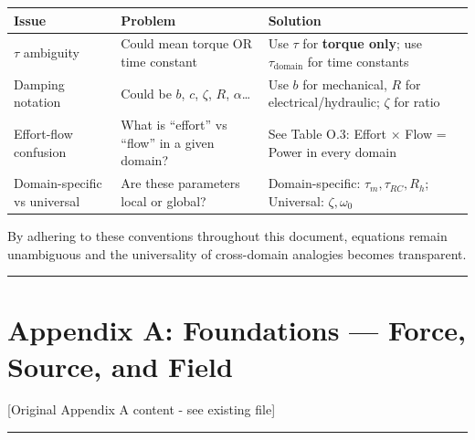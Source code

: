 \documentclass[
]{article}
\begin{document}
\begin{longtable}[]{@{}
  >{\raggedright\arraybackslash}p{}
  >{\raggedright\arraybackslash}p{}
  >{\raggedright\arraybackslash}p{}@{}}
\toprule\noalign{}
\begin{minipage}[b]{\linewidth}\raggedright
Issue
\end{minipage} & \begin{minipage}[b]{\linewidth}\raggedright
\textbf{Problem}
\end{minipage} & \begin{minipage}[b]{\linewidth}\raggedright
\textbf{Solution}
\end{minipage} \\
\midrule\noalign{}
\endhead
\bottomrule\noalign{}
\endlastfoot
\(\tau\) ambiguity & Could mean torque OR time constant & Use \(\tau\)
for \textbf{torque only}; use \(\tau_{\text{domain}}\) for time
constants \\
Damping notation & Could be \(b\), \(c\), \(\zeta\), \(R\),
\(\alpha\)\ldots{} & Use \(b\) for mechanical, \(R\) for
electrical/hydraulic; \(\zeta\) for ratio \\
Effort-flow confusion & What is ``effort'' vs ``flow'' in a given
domain? & See Table O.3: Effort × Flow = Power in every domain \\
Domain-specific vs universal & Are these parameters local or global? &
Domain-specific: \(\tau_m, \tau_{RC}, R_h\); Universal:
\(\zeta, \omega_0\) \\
\end{longtable}

By adhering to these conventions throughout this document, equations
remain unambiguous and the universality of cross-domain analogies
becomes transparent.

\begin{center}\rule{0.5\linewidth}{0.5pt}\end{center}

\section{Appendix A: Foundations --- Force, Source, and
Field}\label{appendix-a-foundations-force-source-and-field}

{[}Original Appendix A content - see existing file{]}

\begin{center}\rule{0.5\linewidth}{0.5pt}\end{center}
\end{document}
